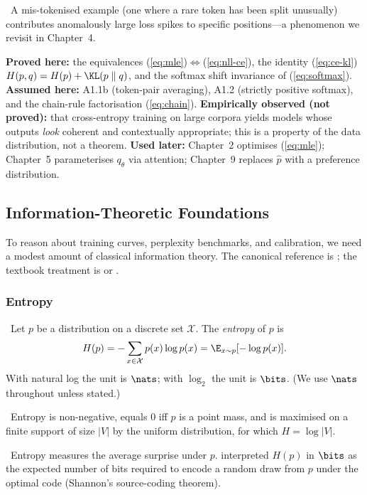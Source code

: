 \Emp\ A mis-tokenised example (one where a rare token has been split
unusually) contributes anomalously large loss spikes to specific
positions---a phenomenon we revisit in Chapter~4.

\begin{provedassumed}
\textbf{Proved here:} the equivalences
(\ref{eq:mle})$\Leftrightarrow$(\ref{eq:nll-ce}), the identity
(\ref{eq:ce-kl}) $H(p,q) = H(p) + \KL(p\parallel q)$, and the softmax
shift invariance of (\ref{eq:softmax}).
\textbf{Assumed here:} A1.1b (token-pair averaging), A1.2 (strictly positive
softmax), and the chain-rule factorisation (\ref{eq:chain}).
\textbf{Empirically observed (not proved):} that cross-entropy
training on large corpora yields models whose outputs \emph{look}
coherent and contextually appropriate; this is a property of the
data distribution, not a theorem.
\textbf{Used later:} Chapter~2 optimises (\ref{eq:mle}); Chapter~5
parameterises $q_\theta$ via attention; Chapter~9 replaces $\hat p$ with
a preference distribution.
\end{provedassumed}

\subsection{Information-Theoretic Foundations}

To reason about training curves, perplexity benchmarks, and calibration, we need a modest amount of classical information theory. The canonical reference is \citet{cover2006elements}; the textbook treatment is \citet{bishop2006prml} or \citet{murphy2022pml}.

\subsubsection{Entropy}

\Def\ Let $p$ be a distribution on a discrete set $\mathcal{X}$. The
\emph{entropy} of $p$ is
\begin{equation}
H(p) = -\sum_{x \in \mathcal{X}} p(x) \log p(x)
     = \E_{x \sim p}[-\log p(x)].
\end{equation}
With natural log the unit is $\nats$; with $\log_2$ the unit is $\bits$.
(We use $\nats$ throughout unless stated.)

\Ident\ Entropy is non-negative, equals $0$ iff $p$ is a point mass,
and is maximised on a finite support of size $|V|$ by the uniform
distribution, for which $H = \log |V|$.

\Cons\ Entropy measures the average surprise under $p$.
\citet{shannon1948} interpreted $H(p)$ in $\bits$ as the expected
number of bits required to encode a random draw from $p$ under the
optimal code (Shannon's source-coding theorem).

